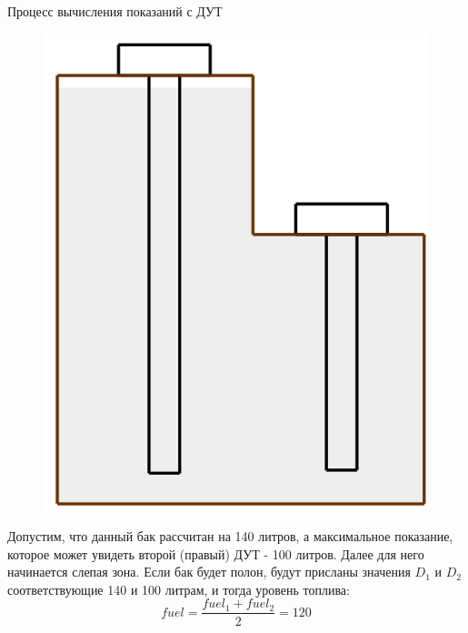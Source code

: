 \documentclass[usenames,dvipsnames,11pt]{beamer}
\begin{document}
\begin{frame}{Процесс вычисления показаний с ДУТ}
	\begin{minipage}[h]{0.39\linewidth}
		\begin{figure}
			\centering
			\includegraphics[width=0.9\linewidth]{graphics/screenshot004}
		\end{figure}
	\end{minipage}
	\hfill
	\begin{minipage}[h]{0.59\linewidth}
		Допустим, что данный бак рассчитан на 140 литров, а максимальное показание, которое может увидеть второй (правый) ДУТ - 100 литров. Далее для него начинается слепая зона.
		\bigbreak
		Если бак будет полон, будут присланы значения $D_1$ и $D_2$ соответствующие 140 и 100 литрам, и тогда уровень топлива:
		$$fuel = \frac{fuel_1 + fuel_2}{2} = 120$$	
	\end{minipage}
\end{frame}
\end{document}
